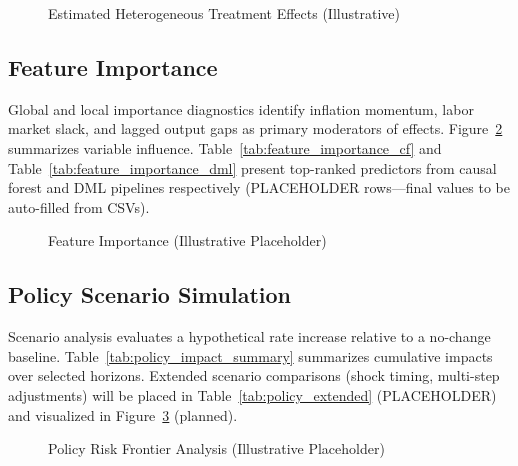 \begin{figure}[H]
  \centering
  \caption{Estimated Heterogeneous Treatment Effects (Illustrative)}\label{fig:heterogeneous_effects}
\end{figure}

\subsection{Feature Importance}
Global and local importance diagnostics identify inflation momentum, labor market slack, and lagged output gaps as primary moderators of \VAT{} effects. Figure~\ref{fig:feature_importance} summarizes variable influence. Table~\ref{tab:feature_importance_cf} and Table~\ref{tab:feature_importance_dml} present top-ranked predictors from causal forest and DML pipelines respectively (PLACEHOLDER rows—final values to be auto-filled from CSVs).

\begin{figure}[H]
  \centering
  \caption{Feature Importance (Illustrative Placeholder)}\label{fig:feature_importance}
\end{figure}

\subsection{Policy Scenario Simulation}
Scenario analysis evaluates a hypothetical \VAT{} rate increase relative to a no-change baseline. Table~\ref{tab:policy_impact_summary} summarizes cumulative impacts over selected horizons. Extended scenario comparisons (shock timing, multi-step adjustments) will be placed in Table~\ref{tab:policy_extended} (PLACEHOLDER) and visualized in Figure~\ref{fig:policy_risk_frontier} (planned).

\begin{figure}[H]
  \centering
  \caption{Policy Risk Frontier Analysis (Illustrative Placeholder)}\label{fig:policy_risk_frontier}
\end{figure}

